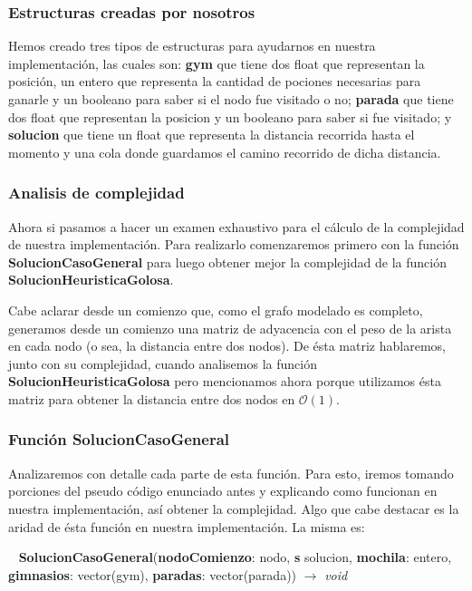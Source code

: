 \subsubsection{Estructuras creadas por nosotros}

Hemos creado tres tipos de estructuras para ayudarnos en nuestra implementación, las cuales son: \textbf{gym} que tiene dos float que representan la posición, un entero que representa la cantidad de pociones necesarias para ganarle y un booleano para saber si el nodo fue visitado o no; \textbf{parada} que tiene dos float que representan la posicion y un booleano para saber si fue visitado; y \textbf{solucion} que tiene un float que representa la distancia recorrida hasta el momento y una cola donde guardamos el camino recorrido de dicha distancia.


\subsubsection{Analisis de complejidad}


Ahora si pasamos a hacer un examen exhaustivo para el cálculo de la complejidad de nuestra implementación. Para realizarlo comenzaremos primero con la función \textbf{SolucionCasoGeneral} para luego obtener mejor la complejidad de la función \textbf{SolucionHeuristicaGolosa}.

Cabe aclarar desde un comienzo que, como el grafo modelado es completo, generamos desde un comienzo una matriz de adyacencia con el peso de la arista en cada nodo (o sea, la distancia entre dos nodos). De ésta matriz hablaremos, junto con su complejidad, cuando analisemos la función \textbf{SolucionHeuristicaGolosa} pero mencionamos ahora porque utilizamos ésta matriz para obtener la distancia entre dos nodos en $\mathcal{O}(1)$.


\subsubsection{Función SolucionCasoGeneral}

Analizaremos con detalle cada parte de esta función. Para esto, iremos tomando porciones del pseudo código enunciado antes y explicando como funcionan en nuestra implementación, así obtener la complejidad. Algo que cabe destacar es la aridad de ésta función en nuestra implementación. La misma es: 

~
\textbf{SolucionCasoGeneral}(\textbf{nodoComienzo}: nodo, \textbf{s} solucion, \textbf{mochila}: entero, \textbf{gimnasios}: vector(gym), \textbf{paradas}: vector(parada)) $\rightarrow$ \textit{void}
~

